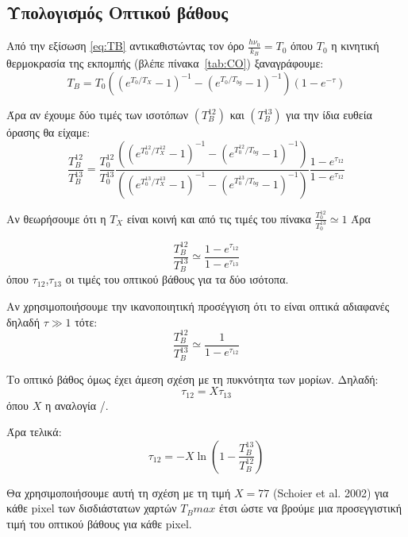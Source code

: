 \documentclass[a4paper,12pt]{memoir}
\begin{document}
\subsection{Υπολογισμός Οπτικού βάθους}
Από την εξίσωση \ref{eq:TB} αντικαθιστώντας τον όρο $\frac{h \nu _0}{k_B}=T_0$ όπου $T_0$ η κινητική θερμοκρασία της εκπομπής (βλέπε πίνακα~\ref{tab:CO}) ξαναγράφουμε:
\begin{equation}
T_B=T_0 \left( (e^{T_0/T_X}-1)^{-1}-(e^{T_0/T_{bg}}-1)^{-1} \right) \left( 1-e^{-\tau}\right) 
\end{equation}

Άρα αν έχουμε δύο τιμές των ισοτόπων  $(T_B ^12)$ και  $(T_B ^13)$ για την ίδια ευθεία όρασης θα είχαμε:
\begin{equation}
\frac{T_B ^{12}}{T_B ^{13}}=\frac{T_0 ^{12}}{T_0 ^{13}}  
\frac{\left( (e^{T_0 ^{12}/T_X ^{12}}-1)^{-1}-(e^{T_0 ^{12}/T_{bg}}-1)^{-1} \right)}
{\left( (e^{T_0 ^{13}/T_X ^{13}}-1)^{-1}-(e^{T_0 ^{13}/T_{bg}}-1)^{-1} \right)} \frac{1-e^{\tau _{12}}}{1-e^{\tau _{12}}}
\end{equation}

Αν θεωρήσουμε ότι η $T_X$ είναι κοινή και από τις τιμές του πίνακα $\frac{T_0 ^{12}}{T_0 ^{13}} \simeq 1$
Άρα

\begin{equation}
\frac{T_B ^{12}}{T_B ^{13}} \simeq \frac{1-e^{\tau _{12}}}{1-e^{\tau _{13}}}
\end{equation}
όπου $\tau _{12}$,$\tau _{13}$ οι τιμές του οπτικού βάθους για τα δύο ισότοπα.

Αν χρησιμοποιήσουμε την ικανοποιητική προσέγγιση ότι το   είναι οπτικά αδιαφανές δηλαδή $\tau \gg 1$ τότε:
\begin{equation}
\frac{T_B ^{12}}{T_B ^{13}} \simeq \frac{1}{1-e^{\tau _{12}}}
\end{equation}

Το οπτικό βάθος όμως έχει άμεση σχέση με τη πυκνότητα των μορίων. Δηλαδή:
\begin{equation}
\tau _{12} = X \tau _{13}
\end{equation}
όπου $X$ η αναλογία /.

Άρα τελικά:
\begin{equation}
\tau _{12} = -X \ln \left( 1-\frac{T_B ^{13}}{T_B ^{12}} \right) 
\end{equation}

Θα χρησιμοποιήσουμε αυτή τη σχέση με τη τιμή $X=77$ (Schoier et al. 2002) για κάθε pixel των δισδιάστατων χαρτών $T_Bmax$ έτσι ώστε να βρούμε μια προσεγγιστική τιμή του οπτικού βάθους για κάθε pixel. 
\end{document}
